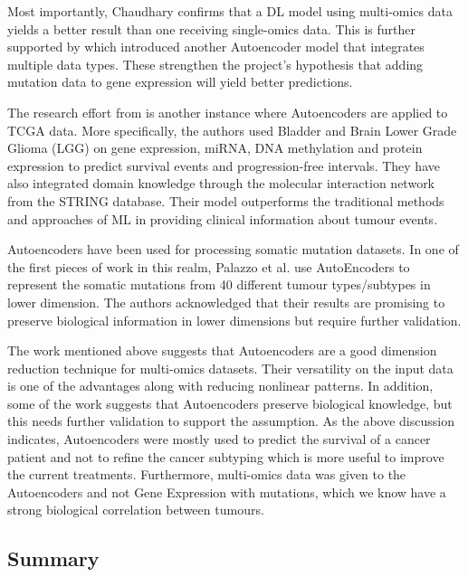 Most importantly, Chaudhary confirms that a DL model using multi-omics data yields a better result than one receiving single-omics data. This is further supported by \citet{Ma2019-hk} which introduced another Autoencoder model that integrates multiple data types. These strengthen the project's hypothesis that adding mutation data to gene expression will yield better predictions.

The research effort from \citet{Ma2019-hk} is another instance where Autoencoders are applied to TCGA data. More specifically, the authors used Bladder and Brain Lower Grade Glioma (LGG) on gene expression, miRNA, DNA methylation and protein expression to predict survival events and progression-free intervals. They have also integrated domain knowledge through the molecular interaction network from the STRING database. Their model outperforms the traditional methods and approaches of ML in providing clinical information about tumour events.

Autoencoders have been used for processing somatic mutation datasets. In one of the first pieces of work in this realm, Palazzo et al. \cite{Palazzo2019-hx} use AutoEncoders to represent the somatic mutations from 40 different tumour types/subtypes in lower dimension. The authors acknowledged that their results are promising to preserve biological information in lower dimensions but require further validation.


The work mentioned above suggests that Autoencoders are a good dimension reduction technique for multi-omics datasets. Their versatility on the input data is one of the advantages along with reducing nonlinear patterns. In addition, some of the work suggests that Autoencoders preserve biological knowledge, but this needs further validation to support the assumption. As the above discussion indicates, Autoencoders were mostly used to predict the survival of a cancer patient and not to refine the cancer subtyping which is more useful to improve the current treatments. Furthermore, multi-omics data was given to the Autoencoders and not Gene Expression with mutations, which we know have a strong biological correlation between tumours.

\subsection{Summary}

